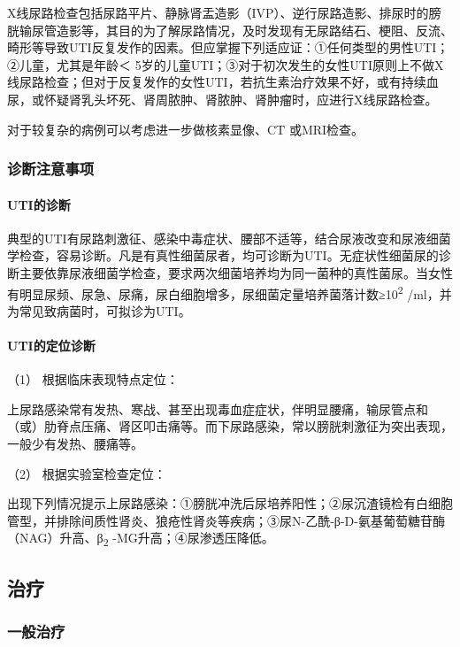 X线尿路检查包括尿路平片、静脉肾盂造影（IVP）、逆行尿路造影、排尿时的膀胱输尿管造影等，其目的为了解尿路情况，及时发现有无尿路结石、梗阻、反流、畸形等导致UTI反复发作的因素。但应掌握下列适应证：①任何类型的男性UTI；②儿童，尤其是年龄＜
5岁的儿童UTI；③对于初次发生的女性UTI原则上不做X线尿路检查；但对于反复发作的女性UTI，若抗生素治疗效果不好，或有持续血尿，或怀疑肾乳头坏死、肾周脓肿、肾脓肿、肾肿瘤时，应进行X线尿路检查。

对于较复杂的病例可以考虑进一步做核素显像、CT 或MRI检查。

\subsubsection{诊断注意事项}

\paragraph{UTI的诊断}

典型的UTI有尿路刺激征、感染中毒症状、腰部不适等，结合尿液改变和尿液细菌学检查，容易诊断。凡是有真性细菌尿者，均可诊断为UTI。无症状性细菌尿的诊断主要依靠尿液细菌学检查，要求两次细菌培养均为同一菌种的真性菌尿。当女性有明显尿频、尿急、尿痛，尿白细胞增多，尿细菌定量培养菌落计数≥10\textsuperscript{2}
/ml，并为常见致病菌时，可拟诊为UTI。

\paragraph{UTI的定位诊断}

\hypertarget{text00345.htmlux5cux23CHP13-6-2-3-2-1}{}
（1） 根据临床表现特点定位：

上尿路感染常有发热、寒战、甚至出现毒血症症状，伴明显腰痛，输尿管点和（或）肋脊点压痛、肾区叩击痛等。而下尿路感染，常以膀胱刺激征为突出表现，一般少有发热、腰痛等。

\hypertarget{text00345.htmlux5cux23CHP13-6-2-3-2-2}{}
（2） 根据实验室检查定位：

出现下列情况提示上尿路感染：①膀胱冲洗后尿培养阳性；②尿沉渣镜检有白细胞管型，并排除间质性肾炎、狼疮性肾炎等疾病；③尿N-乙酰-β-D-氨基葡萄糖苷酶（NAG）升高、β\textsubscript{2}
-MG升高；④尿渗透压降低。

\subsection{治疗}

\subsubsection{一般治疗}

